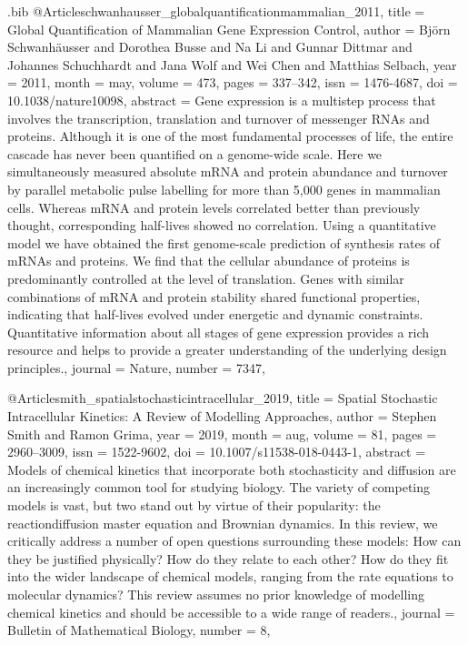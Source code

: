 \documentclass[
  table,
  10pt,
  a4paper]{article}
\begin{document}
\begin{filecontents}{\jobname.bib}
@Article{schwanhausser_globalquantificationmammalian_2011,
	title = {Global Quantification of Mammalian Gene Expression Control},
	author = {Bj{\"o}rn Schwanh{\"a}usser and Dorothea Busse and Na Li and Gunnar Dittmar and Johannes Schuchhardt and Jana Wolf and Wei Chen and Matthias Selbach},
	year = {2011},
	month = {may},
	volume = {473},
	pages = {337--342},
	issn = {1476-4687},
	doi = {10.1038/nature10098},
	abstract = {Gene expression is a multistep process that involves the transcription, translation and turnover of messenger RNAs and proteins. Although it is one of the most fundamental processes of life, the entire cascade has never been quantified on a genome-wide scale. Here we simultaneously measured absolute mRNA and protein abundance and turnover by parallel metabolic pulse labelling for more than 5,000 genes in mammalian cells. Whereas mRNA and protein levels correlated better than previously thought, corresponding half-lives showed no correlation. Using a quantitative model we have obtained the first genome-scale prediction of synthesis rates of mRNAs and proteins. We find that the cellular abundance of proteins is predominantly controlled at the level of translation. Genes with similar combinations of mRNA and protein stability shared functional properties, indicating that half-lives evolved under energetic and dynamic constraints. Quantitative information about all stages of gene expression provides a rich resource and helps to provide a greater understanding of the underlying design principles.},
	journal = {Nature},
	number = {7347},
}

@Article{smith_spatialstochasticintracellular_2019,
	title = {Spatial {{Stochastic Intracellular Kinetics}}: {{A Review}} of {{Modelling Approaches}}},
	author = {Stephen Smith and Ramon Grima},
	year = {2019},
	month = {aug},
	volume = {81},
	pages = {2960--3009},
	issn = {1522-9602},
	doi = {10.1007/s11538-018-0443-1},
	abstract = {Models of chemical kinetics that incorporate both stochasticity and diffusion are an increasingly common tool for studying biology. The variety of competing models is vast, but two stand out by virtue of their popularity: the reaction\textendash diffusion master equation and Brownian dynamics. In this review, we critically address a number of open questions surrounding these models: How can they be justified physically? How do they relate to each other? How do they fit into the wider landscape of chemical models, ranging from the rate equations to molecular dynamics? This review assumes no prior knowledge of modelling chemical kinetics and should be accessible to a wide range of readers.},
	journal = {Bulletin of Mathematical Biology},
	number = {8},
}


\end{filecontents}
\end{document}
